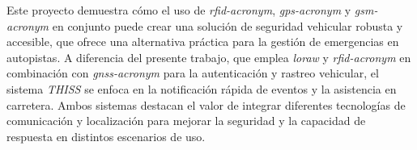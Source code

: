 Este proyecto demuestra cómo el uso de \textit{\acrshort{rfid-acronym}}, \textit{\acrshort{gps-acronym}} y \textit{\acrshort{gsm-acronym}} en conjunto puede crear una solución de seguridad vehicular robusta y accesible, que ofrece una alternativa práctica para la gestión de emergencias en autopistas. A diferencia del presente trabajo, que emplea \textit{\acrshort{loraw}} y \textit{\acrshort{rfid-acronym}} en combinación con \textit{\acrshort{gnss-acronym}} para la autenticación y rastreo vehicular, el sistema \textit{THISS} se enfoca en la notificación rápida de eventos y la asistencia en carretera. Ambos sistemas destacan el valor de integrar diferentes tecnologías de comunicación y localización para mejorar la seguridad y la capacidad de respuesta en distintos escenarios de uso.
